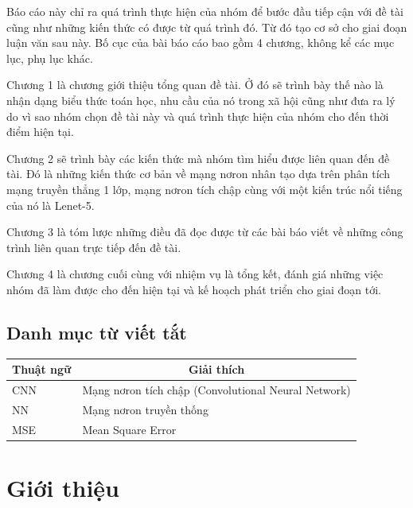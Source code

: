 \documentclass[a4paper,12pt]{article}
\begin{document}
	Báo cáo này chỉ ra quá trình thực hiện của nhóm để bước đầu tiếp cận với đề tài cũng như những kiến thức có được từ quá trình đó. Từ đó tạo cơ sở cho giai đoạn luận văn sau này. Bố cục của bài báo cáo bao gồm 4 chương, không kể các mục lục, phụ lục khác.
	
	Chương 1 là chương giới thiệu tổng quan đề tài. Ở đó sẽ trình bày thế nào là nhận dạng biểu thức toán học, nhu cầu của nó trong xã hội cũng như đưa ra lý do vì sao nhóm chọn đề tài này và quá trình thực hiện của nhóm cho đến thời điểm hiện tại.
	
	Chương 2 sẽ trình bày các kiến thức mà nhóm tìm hiểu được liên quan đến đề tài. Đó là những kiến thức cơ bản về mạng nơron nhân tạo dựa trên phân tích mạng truyền thẳng 1 lớp, mạng nơron tích chập cùng với một kiến trúc nổi tiếng của nó là Lenet-5.
	
	Chương 3 là tóm lược những điều đã đọc được từ các bài báo viết về những công trình liên quan trực tiếp đến đề tài.
	
	Chương 4 là chương cuối cùng với nhiệm vụ là tổng kết, đánh giá những việc nhóm đã làm được cho đến hiện tại và kế hoạch phát triển cho giai đoạn tới.
	\newpage
	\setlength{\cftsecnumwidth}{3cm}
	\tableofcontents
	\newpage
	\listoffigures
	\newpage
	
	\subsection*{Danh mục từ viết tắt}
	
	
	
	\begin{table} [!htb]
		\centering
		\begin{tabular}{| m{4cm} | m{12cm}|}\hline
			\multicolumn{1}{|c|}{\textbf{Thuật ngữ}} & 
			\multicolumn{1}{|c|}{\textbf{Giải thích}}\\\hline
			CNN & Mạng nơron tích chập (Convolutional Neural Network)\\\hline
			NN & Mạng nơron truyền thống \\\hline
			MSE & Mean Square Error\\\hline
		\end{tabular}
	\end{table}
	
	\newpage
	\section{Giới thiệu}
\end{document}
